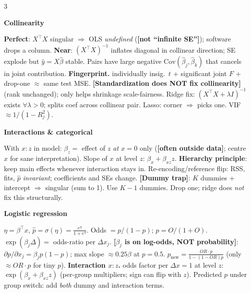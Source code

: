 \documentclass[a4paper,8pt]{extarticle}
\renewcommand{\section}[1]{\par\vspace{2pt}\noindent\colorbox{black!15}{\parbox{0.97\linewidth}{\strut\bfseries\small #1}}\par\vspace{1pt}}
\newcommand{\hd}[1]{\textbf{#1.}}
\newcommand{\tr}[1]{\textcolor{red!70!black}{\textbf{[#1]}}} %
\newcommand{\Cov}{\mathrm{Cov}}
\begin{document}
\begin{multicols*}{3}
\section{Collinearity}
\textbf{Perfect}: $X^\top X$ singular $\Rightarrow$ OLS \emph{undefined} (\tr{not ``infinite SE''}); software drops a column.
\textbf{Near}: $(X^\top X)^{-1}$ inflates diagonal in collinear direction; SE explode but $\hat y=X\hat\beta$ stable. Pairs have large negative $\Cov(\hat\beta_j,\hat\beta_k)$ that cancels in joint contribution.
\hd{Fingerprint} individually insig.\ $t$ + significant joint $F$ + drop-one $\approx$ same test MSE.
\tr{Standardization does NOT fix collinearity} (rank unchanged); only helps shrinkage scale-fairness.
Ridge fix: $(X^\top X+\lambda I)^{-1}$ exists $\forall\lambda>0$; splits coef across collinear pair. Lasso: corner $\Rightarrow$ picks one. VIF $\approx 1/(1-R_j^2)$.

\section{Interactions \& categorical}
With $x{:}z$ in model: $\beta_z=$ effect of $z$ \emph{at $x=0$} only (\tr{often outside data}; centre $x$ for sane interpretation).
Slope of $x$ at level $z$: $\beta_x+\beta_{xz}z$. \textbf{Hierarchy principle}: keep main effects whenever interaction stays in.
Re-encoding/reference flip: RSS, fits, $\hat p$ \emph{invariant}; coefficients and SEs change.
\tr{Dummy trap}: $K$ dummies + intercept $\Rightarrow$ singular (sum to 1). Use $K-1$ dummies. Drop one; ridge does \emph{not} fix this structurally.

\section{Logistic regression}
$\eta=\beta^\top x$, $\hat p=\sigma(\eta)=\tfrac{e^\eta}{1+e^\eta}$. Odds $=p/(1-p)$; $p=O/(1+O)$.
$\exp(\beta_j\Delta)=$ odds-ratio per $\Delta x_j$. \tr{$\beta_j$ is on log-odds, NOT probability}: $\partial p/\partial x_j=\beta_j p(1-p)$; max slope $\approx 0.25\beta$ at $p=0.5$.
$p_{\text{new}}=\tfrac{OR\cdot p}{1-(1-OR)p}$ (only $\approx OR\cdot p$ for tiny $p$).
\hd{Interaction $x{:}z$} odds factor per $\Delta x{=}1$ at level $z$: $\exp(\beta_x+\beta_{xz}z)$ (per-group multipliers; sign can flip with $z$). Predicted $p$ under group switch: add \emph{both} dummy and interaction terms.


\end{multicols*}
\end{document}
